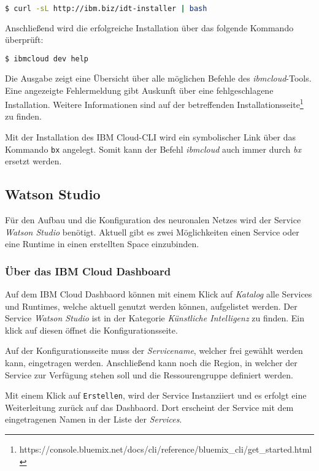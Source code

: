 \begin{lstlisting}[language=bash, caption=Installation des IBM Cloud CLI, label=Installation des IBM Cloud CLI]
    $ curl -sL http://ibm.biz/idt-installer | bash
\end{lstlisting}

Anschließend wird die erfolgreiche Installation über das folgende Kommando überprüft:

\begin{lstlisting}[language=bash, caption=Installation des CLI überprüfen, label=Installation des CLI überprüfen]
    $ ibmcloud dev help
\end{lstlisting}

Die Ausgabe zeigt eine Übersicht über alle möglichen Befehle des \textit{ibmcloud}-Tools. Eine angezeigte Fehlermeldung
gibt Auskunft über eine fehlgeschlagene Installation. Weitere Informationen sind auf der betreffenden
Installationsseite\footnote{https://console.bluemix.net/docs/cli/reference/bluemix\_cli/get\_started.html} zu finden.

Mit der Installation des IBM Cloud-CLI wird ein symbolischer Link über das Kommando \texttt{bx} angelegt. Somit kann der
Befehl \textit{ibmcloud} auch immer durch \textit{bx} ersetzt werden.

\subsection{Watson Studio}
Für den Aufbau und die Konfiguration des neuronalen Netzes wird der Service \textit{Watson Studio} benötigt. Aktuell gibt
es zwei Möglichkeiten einen Service oder eine Runtime in einen erstellten Space einzubinden.

\subsubsection*{Über das IBM Cloud Dashboard}
Auf dem IBM Cloud Dashbaord können mit einem Klick auf \textit{Katalog} alle Services und Runtimes, welche aktuell genutzt
werden können, aufgelistet werden. Der Service \textit{Watson Studio} ist in der Kategorie \textit{Künstliche Intelligenz}
zu finden. Ein klick auf diesen öffnet die Konfigurationsseite.

Auf der Konfigurationsseite muss der \textit{Servicename}, welcher frei gewählt werden kann, eingetragen werden.
Anschließend kann noch die Region, in welcher der Service zur Verfügung stehen soll und die Ressourengruppe definiert
werden.

Mit einem Klick auf \texttt{Erstellen}, wird der Service Instanziiert und es erfolgt eine Weiterleitung zurück auf das
Dashbaord. Dort erscheint der Service mit dem eingetragenen Namen in der Liste der \textit{Services}.

